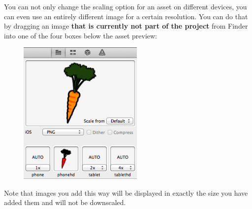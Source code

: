 \begin{details}[frametitle={Different images for different devices}] 
You can not only change the scaling option for an asset on different devices,
you can even use an entirely different image for a certain resolution. You can
do that by dragging an image \textbf{that is currently not part of the \SB{}
project} from Finder into one of the four boxes below the asset preview:

\begin{figure}[H]
		\centering
		\includegraphics[height=200pt]{images/Chapter2/DifferentImageDevice.png}
\end{figure}

Note that images you add this way will be displayed in exactly the size you have
added them and will not be downscaled.

\end{details}
